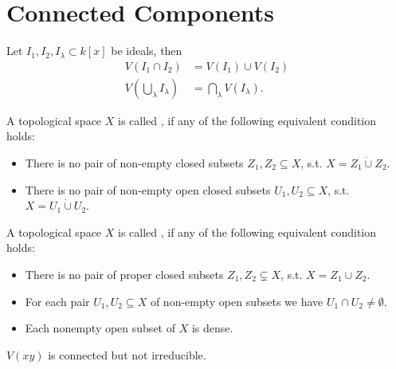 \section{Connected Components}

\begin{lemma}
	Let $I_1, I_2, I_\lambda \subset k[x]$ be ideals, then
	\begin{align*}
	V(I_1 \cap I_2) &= V(I_1) \cup V(I_2)\\
	 V(\bigcup_\lambda I_\lambda) &= \bigcap_\lambda V(I_\lambda).
	\end{align*}
\end{lemma}

\begin{definition}
	A topological space $X$ is  called , if any of the following equivalent condition holds:
	\begin{itemize}
		\item There is no pair of non-empty closed subsets $Z_1,Z_2 \subseteq X$, s.t. $X = Z_1 \dot{\cup} Z_2$.
		\item There is no pair of non-empty open closed subsets $U_1,U_2 \subseteq X$, s.t. $X = U_1 \dot{\cup} U_2$.
	\end{itemize}
\end{definition}

\begin{definition}
	A topological space $X$ is  called , if any of the following equivalent condition holds:
	\begin{itemize}
		\item There is no pair of proper closed subsets $Z_1,Z_2 \subsetneq X$, s.t. $X = Z_1 \cup Z_2$.
		\item For each pair $U_1,U_2 \subseteq X$ of non-empty open subsets we have $U_1\cap U_2 \neq \emptyset$.
		\item Each nonempty open subset of $X$ is dense.
	\end{itemize}
\end{definition}

\begin{example}
	$V(xy)$ is connected but not irreducible.
\end{example}
